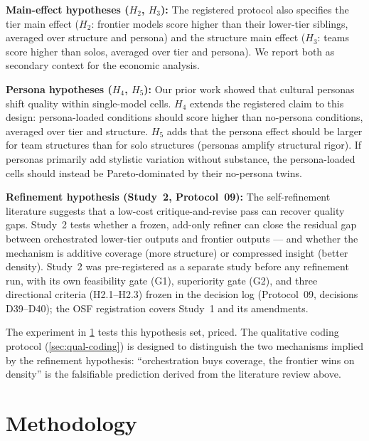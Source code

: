 \documentclass[12pt,a4paper]{article}
\begin{document}
\medskip
\noindent\textbf{Main-effect hypotheses ($H_2$, $H_3$):} The registered
protocol also specifies the tier main effect ($H_2$: frontier models score
higher than their lower-tier siblings, averaged over structure and persona)
and the structure main effect ($H_3$: teams score higher than solos, averaged
over tier and persona). We report both as secondary context for the economic
analysis.

\medskip
\noindent\textbf{Persona hypotheses ($H_4$, $H_5$):} Our prior work
\citep{Hariri2026b} showed that cultural personas shift quality within
single-model cells. $H_4$ extends the registered claim to this design:
persona-loaded conditions should score higher than no-persona conditions,
averaged over tier and structure. $H_5$ adds that the persona effect should be
larger for team structures than for solo structures (personas amplify
structural rigor). If personas primarily add stylistic variation without
substance, the persona-loaded cells should instead be Pareto-dominated by
their no-persona twins.

\medskip
\noindent\textbf{Refinement hypothesis (Study~2, Protocol~09):} The
self-refinement literature \citep{ShinnEtAl2023} suggests that a low-cost
critique-and-revise pass can recover quality gaps. Study~2 tests whether a
frozen, add-only refiner can close the residual gap between orchestrated
lower-tier outputs and frontier outputs --- and whether the mechanism is
additive coverage (more structure) or compressed insight (better density).
Study~2 was pre-registered as a separate study before any refinement run,
with its own feasibility gate (G1), superiority gate (G2), and three
directional criteria (H2.1--H2.3) frozen in the decision log (Protocol~09,
decisions D39--D40); the OSF registration covers Study~1 and its amendments.

The experiment in \cref{sec:method} tests this hypothesis set, priced. The
qualitative coding protocol (\cref{sec:qual-coding}) is designed to distinguish
the two mechanisms implied by the refinement hypothesis: ``orchestration buys
coverage, the frontier wins on density'' is the falsifiable prediction derived
from the literature review above.


\section{Methodology}\label{sec:method}
\end{document}
